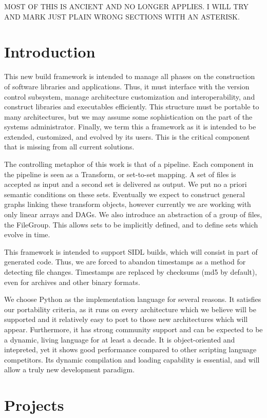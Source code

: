 MOST OF THIS IS ANCIENT AND NO LONGER APPLIES. I WILL TRY AND MARK JUST PLAIN WRONG
SECTIONS WITH AN ASTERISK.

\section{Introduction}

This new build framework is intended to manage all phases on the construction of software libraries and
applications. Thus, it must interface with the version control subsystem, manage architecture customization and
interoperability, and construct libraries and executables efficiently. This structure must be portable to many
architectures, but we may assume some sophistication on the part of the systems administrator. Finally, we term this a
framework as it is intended to be extended, customized, and evolved by its users. This is the critical component that is
missing from all current solutions.

The controlling metaphor of this work is that of a pipeline. Each component in the pipeline is seen as a Transform, or
set-to-set mapping. A set of files is accepted as input and a second set is delivered as output. We put no a priori
semantic conditions on these sets. Eventually we expect to construct general graphs linking these transform objects,
however currently we are working with only linear arrays and DAGs. We also introduce an abstraction of a group of files,
the FileGroup. This allows sets to be implicitly defined, and to define sets which evolve in time.

This framework is intended to support SIDL builds, which will consist in part of generated code. Thus, we are forced to
abandon timestamps as a method for detecting file changes. Timestamps are replaced by checksums (md5 by default), even
for archives and other binary formats.

We choose Python as the implementation language for several reasons. It satisfies our portability criteria, as it runs
on every architecture which we believe will be supported and it relatively easy to port to those new architectures which
will appear. Furthermore, it has strong community support and can be expected to be a dynamic, living language for at
least a decade. It is object-oriented and intepreted, yet it shows good performance compared to other scripting language
competitors. Its dynamic compilation and loading capability is essential, and will allow a truly new development paradigm.

\section{Projects}

